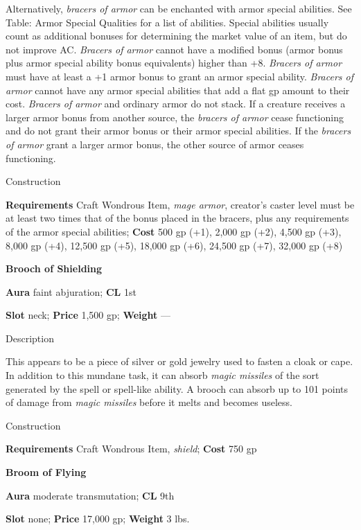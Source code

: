 Alternatively, \textit{bracers of armor} can be enchanted with armor special abilities. See Table: Armor Special Qualities for a list of abilities. Special abilities usually count as additional bonuses for determining the market value of an item, but do not improve AC. \textit{Bracers of armor} cannot have a modified bonus (armor bonus plus armor special ability bonus equivalents) higher than +8. \textit{Bracers of armor} must have at least a +1 armor bonus to grant an armor special ability. \textit{Bracers of armor }cannot have any armor special abilities that add a flat gp amount to their cost. \textit{Bracers of armor} and ordinary armor do not stack. If a creature receives a larger armor bonus from another source, the \textit{bracers of armor} cease functioning and do not grant their armor bonus or their armor special abilities. If the \textit{bracers of armor} grant a larger armor bonus, the other source of armor ceases functioning.
				
Construction
				
\textbf{Requirements} Craft Wondrous Item, \textit{mage armor}, creator's caster level must be at least two times that of the bonus placed in the bracers, plus any requirements of the armor special abilities; \textbf{Cost }500 gp (+1), 2,000 gp (+2), 4,500 gp (+3), 8,000 gp (+4), 12,500 gp (+5), 18,000 gp (+6), 24,500 gp (+7), 32,000 gp (+8)
				
\textbf{Brooch of Shielding}
				
\textbf{Aura} faint abjuration;\textbf{ CL }1st
				
\textbf{Slot} neck; \textbf{Price} 1,500 gp; \textbf{Weight }---
				
Description
				
This appears to be a piece of silver or gold jewelry used to fasten a cloak or cape. In addition to this mundane task, it can absorb \textit{magic missiles }of the sort generated by the spell or spell-like ability. A brooch can absorb up to 101 points of damage from \textit{magic missiles }before it melts and becomes useless. 
				
Construction
				
\textbf{Requirements} Craft Wondrous Item, \textit{shield}; \textbf{Cost }750 gp
				
\textbf{Broom of Flying}
				
\textbf{Aura} moderate transmutation;\textbf{ CL }9th
				
\textbf{Slot} none; \textbf{Price} 17,000 gp; \textbf{Weight} 3 lbs.
				
